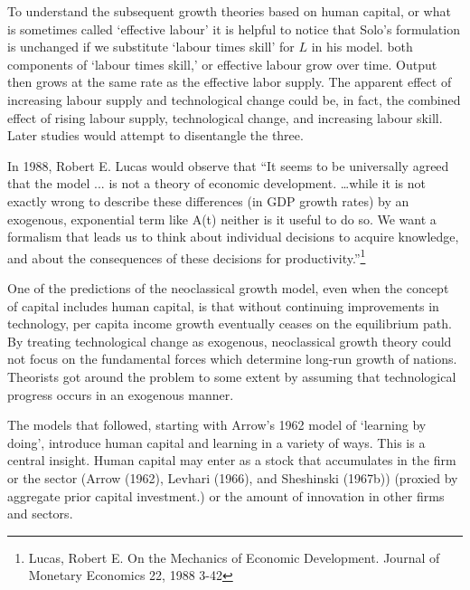 To understand the subsequent growth theories based on human capital, or what is sometimes called `effective labour' it is helpful to notice that Solo's formulation is unchanged if we substitute `labour times  skill' for $L$ in his model. both components of `labour times  skill,' or effective labour grow over time. Output then grows at the same rate as the effective labor supply. The apparent effect of increasing labour supply and technological change could be, in fact, the combined effect of rising labour supply, technological change, and increasing labour skill. Later studies would attempt to disentangle the three.


In 1988, Robert E. Lucas would observe that ``It seems to be universally agreed that the model ... is not a theory of economic development.   \dots while it is not exactly wrong to describe these differences (in GDP  growth rates) by an exogenous, exponential term like A(t) neither is it useful to do so. We want a formalism that leads us to think about individual decisions to acquire knowledge, and about the consequences of these decisions for productivity.''\footnote{Lucas,  Robert E. On the Mechanics of Economic Development. Journal of Monetary Economics 22, 1988 3-42} 




One of the predictions of the neoclassical growth model, even  when the concept of capital includes human capital, is that without  continuing improvements in technology, per capita income growth eventually ceases on the equilibrium path. 
By treating technological change as exogenous, neoclassical growth theory could not focus on the fundamental forces which determine long-run growth of nations. Theorists got around the problem to some extent by assuming that technological progress occurs in an exogenous manner. 

The models that followed, starting with Arrow's 1962 model of `learning by doing', introduce human capital and learning in a variety of ways. This is a central insight. Human capital may enter  as a stock that accumulates in the firm or the sector (Arrow (1962), Levhari (1966), and Sheshinski (1967b)) (proxied by aggregate prior capital investment.)
or the amount of innovation in other firms and sectors. %


